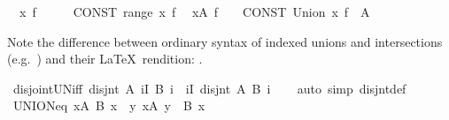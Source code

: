 \begin{isabellebody}
\ \ {\isachardoublequoteopen}{\isasymUnion}x{\isachardot}{\kern0pt}\ f{\isachardoublequoteclose}\ \ \ \ \ {\isasymrightleftharpoons}\ {\isachardoublequoteopen}{\isasymUnion}{\isacharparenleft}{\kern0pt}CONST\ range\ {\isacharparenleft}{\kern0pt}{\isasymlambda}x{\isachardot}{\kern0pt}\ f{\isacharparenright}{\kern0pt}{\isacharparenright}{\kern0pt}{\isachardoublequoteclose}\isanewline
\ \ {\isachardoublequoteopen}{\isasymUnion}x{\isasymin}A{\isachardot}{\kern0pt}\ f{\isachardoublequoteclose}\ \ \ {\isasymrightleftharpoons}\ {\isachardoublequoteopen}CONST\ Union\ {\isacharparenleft}{\kern0pt}{\isacharparenleft}{\kern0pt}{\isasymlambda}x{\isachardot}{\kern0pt}\ f{\isacharparenright}{\kern0pt}\ {\isacharbackquote}{\kern0pt}\ A{\isacharparenright}{\kern0pt}{\isachardoublequoteclose}%
\begin{isamarkuptext}%
Note the difference between ordinary syntax of indexed
  unions and intersections (e.g.\ )
  and their \LaTeX\ rendition: .%
\end{isamarkuptext}\isamarkuptrue%
\isamarkupfalse%
\ disjoint{\isacharunderscore}{\kern0pt}UN{\isacharunderscore}{\kern0pt}iff{\isacharcolon}{\kern0pt}\ {\isachardoublequoteopen}disjnt\ A\ {\isacharparenleft}{\kern0pt}{\isasymUnion}i{\isasymin}I{\isachardot}{\kern0pt}\ B\ i{\isacharparenright}{\kern0pt}\ {\isasymlongleftrightarrow}\ {\isacharparenleft}{\kern0pt}{\isasymforall}i{\isasymin}I{\isachardot}{\kern0pt}\ disjnt\ A\ {\isacharparenleft}{\kern0pt}B\ i{\isacharparenright}{\kern0pt}{\isacharparenright}{\kern0pt}{\isachardoublequoteclose}\isanewline
%
\isadelimproof
\ \ %
\endisadelimproof
%
\isatagproof
{}\isamarkupfalse%
\ {\isacharparenleft}{\kern0pt}auto\ simp{\isacharcolon}{\kern0pt}\ disjnt{\isacharunderscore}{\kern0pt}def{\isacharparenright}{\kern0pt}%
\endisatagproof
{\isafoldproof}%
%
\isadelimproof
\isanewline
%
\endisadelimproof
\isanewline
{}\isamarkupfalse%
\ UNION{\isacharunderscore}{\kern0pt}eq{\isacharcolon}{\kern0pt}\ {\isachardoublequoteopen}{\isacharparenleft}{\kern0pt}{\isasymUnion}x{\isasymin}A{\isachardot}{\kern0pt}\ B\ x{\isacharparenright}{\kern0pt}\ {\isacharequal}{\kern0pt}\ {\isacharbraceleft}{\kern0pt}y{\isachardot}{\kern0pt}\ {\isasymexists}x{\isasymin}A{\isachardot}{\kern0pt}\ y\ {\isasymin}\ B\ x{\isacharbraceright}{\kern0pt}{\isachardoublequoteclose}\isanewline

\end{isabellebody}
